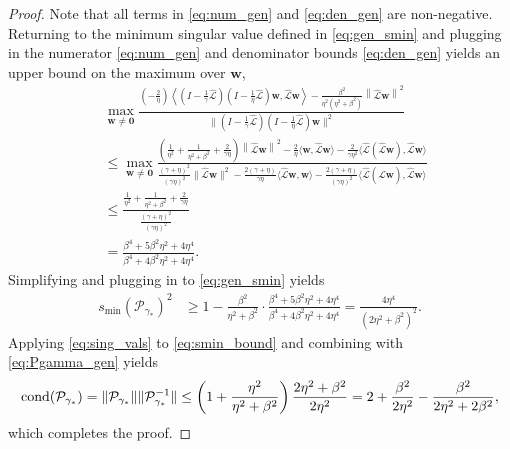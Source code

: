 \documentclass[a4paper,10pt]{article}
\begin{document}
{\begin{proof}
Note that all terms in \eqref{eq:num_gen} and \eqref{eq:den_gen} are non-negative.
Returning to the minimum singular value defined in \eqref{eq:gen_smin} and plugging in
the numerator \eqref{eq:num_gen} and denominator bounds \eqref{eq:den_gen} yields
an upper bound on the maximum over $\mathbf{w}$,
%
\begin{align*}
&\max_{\mathbf{w}\neq\mathbf{0}}
	\frac{(-\tfrac{2}{\eta})\left\langle(I - \tfrac{1}{\gamma}\widehat{\mathcal{L}})(I -
		\tfrac{1}{\eta}\widehat{\mathcal{L}})\mathbf{w},
		\widehat{\mathcal{L}}\mathbf{w} \right\rangle- 
		\frac{\beta^2}{\eta^2(\eta^2+\beta^2)}\left\|\widehat{\mathcal{L}}\mathbf{w} \right\|^2}
	{\|(I - \tfrac{1}{\gamma}\widehat{\mathcal{L}})(I - \tfrac{1}{\eta}\widehat{\mathcal{L}})\mathbf{w}\|^2} \\
& \leq \max_{\mathbf{w}\neq\mathbf{0}}\frac{\left(\frac{1}{\eta^2} +
		\frac{1}{\eta^2+\beta^2} + \frac{2}{\gamma\eta}\right)
			\left\|\widehat{\mathcal{L}}\mathbf{w} \right\|^2
		- \frac{2}{\eta}\langle\mathbf{w},\widehat{\mathcal{L}}\mathbf{w}\rangle
		- \frac{2}{\gamma\eta^2}\langle\widehat{\mathcal{L}}(\widehat{\mathcal{L}}\mathbf{w}),\widehat{\mathcal{L}}\mathbf{w}\rangle}
	{\frac{(\gamma+\eta)^2}{(\gamma\eta)^2}\|\widehat{\mathcal{L}}\mathbf{w}\|^2
	- \frac{2(\gamma+\eta)}{\gamma\eta}\langle \widehat{\mathcal{L}}\mathbf{w}, \mathbf{w}\rangle
	- \frac{2(\gamma+\eta)}{(\gamma\eta)^2}\langle \widehat{\mathcal{L}}(\widehat{\mathcal{L}}\mathbf{w}),
		\widehat{\mathcal{L}}\mathbf{w}\rangle} \nonumber\\
& \leq \frac{\frac{1}{\eta^2} + \frac{1}{\eta^2+\beta^2}+ \frac{2}{\gamma\eta}}
	{\frac{(\gamma+\eta)^2}{(\gamma\eta)^2}} \\
& = \frac{\beta^4+5\beta^2\eta^2+4\eta^4}{\beta^4+4\beta^2\eta^2+4\eta^4}.
\end{align*}
%
Simplifying and plugging in to \eqref{eq:gen_smin} yields
%
\begin{align}\label{eq:smin_bound}
s_{\min}(\mathcal{P}_{\gamma_*})^2 &\geq 1 - \frac{\beta^2}{\eta^2+\beta^2} \cdot
	\frac{\beta^4+5\beta^2\eta^2+4\eta^4}{\beta^4+4\beta^2\eta^2+4\eta^4}
= \frac{4\eta^4}{(2\eta^2+\beta^2)^2}.
\end{align}
%
Applying \eqref{eq:sing_vals} to \eqref{eq:smin_bound} and
combining with \eqref{eq:Pgamma_gen} yields
%
\begin{align}
\textnormal{cond}(\mathcal{P}_{\gamma_*}) = \|\mathcal{P}_{\gamma_*}\|\|\mathcal{P}_{\gamma_*}^{-1}\|
	\leq \left(1+\frac{\eta^2}{\eta^2+\beta^2}\right)\frac{2\eta^2+\beta^2}{2\eta^2}
	= 2+\frac{\beta^2}{2\eta^2} - \frac{\beta^2}{2\eta^2+2\beta^2},
\end{align}
%
which completes the proof.
\end{proof}
%



}
\end{document}
